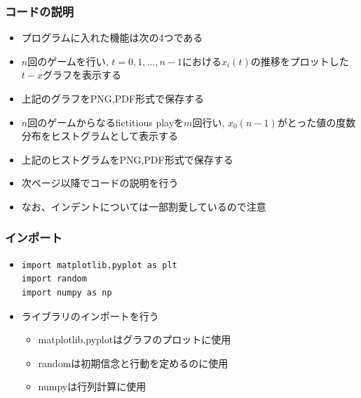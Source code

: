 \documentclass[dvipdfmx,fleqn,handout]{beamer}
\begin{document}
\begin{frame}[fragile]   %
\frametitle{コードの説明}
\begin{itemize}\setlength{\parskip}{0.5em}

\item
プログラムに入れた機能は次の4つである\pause
\item
$n$回のゲームを行い, $t=0,1,\dots,n-1$における$x_i(t)$の推移をプロットした$t-x$グラフを表示する\pause
\item
上記のグラフをPNG,PDF形式で保存する\pause
\item
$n$回のゲームからなるfictitious playを$m$回行い, $x_0(n-1)$がとった値の度数分布をヒストグラムとして表示する\pause
\item
上記のヒストグラムをPNG,PDF形式で保存する\pause
\item
次ページ以降でコードの説明を行う\pause
\item
なお、インデントについては一部割愛しているので注意
\end{itemize}
\end{frame}

\begin{frame}[fragile]   %
\frametitle{インポート}
\begin{itemize}\setlength{\parskip}{0.5em}

\item
\footnotesize
\begin{verbatim}
import matplotlib.pyplot as plt
import random
import numpy as np
\end{verbatim}
\pause
\normalsize
\item
ライブラリのインポートを行う\pause
\begin{itemize}\setlength{\parskip}{0.5em}
\item
matplotlib.pyplotはグラフのプロットに使用　\pause

\item
randomは初期信念と行動を定めるのに使用　\pause

\item
numpyは行列計算に使用
\end{itemize}

\end{itemize}
\end{frame}
\end{document}
